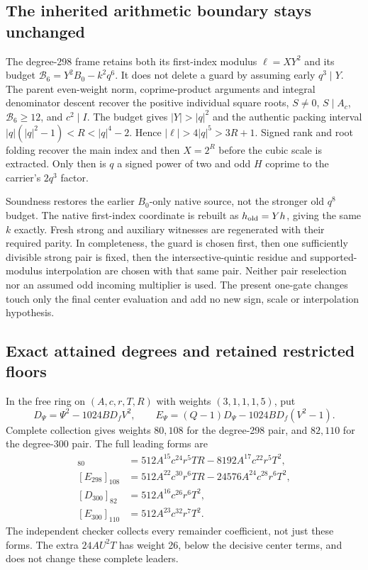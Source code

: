 \subsection{The inherited arithmetic boundary stays unchanged}
The degree-298 frame retains both its first-index modulus
$\ell=XY^2$ and its budget $\mathcal B_6=Y^2B_0-k^2q^6$.
It does not delete a guard by assuming early $q^3\mid Y$.
The parent even-weight norm, coprime-product arguments and integral
denominator descent recover the positive individual square roots,
$S\ne0$, $S\mid A_c$, $\mathcal B_6\ge12$, and $c^2\mid I$.
The budget gives $|Y|>|q|^2$ and the authentic packing interval
$|q|(|q|^2-1)<R<|q|^4-2$. Hence
$|\ell|>4|q|^5>3R+1$. Signed rank and root folding recover the
main index and then $X=2^R$ before the cubic scale is extracted.
Only then is $q$ a signed power of two and odd $H$ coprime to the
carrier's $2q^3$ factor.

Soundness restores the earlier $B_0$-only native source, not the stronger
old $q^8$ budget. The native first-index coordinate is rebuilt as
$h_{\rm old}=Yh$, giving the same $k$ exactly. Fresh strong and
auxiliary witnesses are regenerated with their required parity.
In completeness, the guard is chosen first, then one sufficiently
divisible strong pair is fixed, then the intersective-quintic residue
and supported-modulus interpolation are chosen with that same pair.
Neither pair reselection nor an assumed odd incoming multiplier is used.
The present one-gate changes touch only the final center evaluation and
add no new sign, scale or interpolation hypothesis.

\subsection{Exact attained degrees and retained restricted floors}
In the free ring on $(A,c,r,T,R)$ with weights $(3,1,1,1,5)$,
put
\[
 D_\Psi=\Psi^2-1024BD_fV^2,\qquad
 E_\Psi=(Q-1)D_\Psi-1024BD_f(V^2-1).
\]
Complete collection gives weights $80,108$ for the degree-298 pair,
and $82,110$ for the degree-300 pair. The full leading forms are
\begin{align*}
 [D_{298}]_{80}&=512A^{15}c^{24}r^5TR-8192A^{17}c^{22}r^5T^2,\\
 [E_{298}]_{108}&=512A^{22}c^{30}r^6TR-24576A^{24}c^{28}r^6T^2,\\
 [D_{300}]_{82}&=512A^{16}c^{26}r^6T^2,\\
 [E_{300}]_{110}&=512A^{23}c^{32}r^7T^2.
\end{align*}
The independent checker collects every remainder coefficient, not just
these forms. The extra $24AU^2T$ has weight 26, below the decisive
center terms, and does not change these complete leaders.

